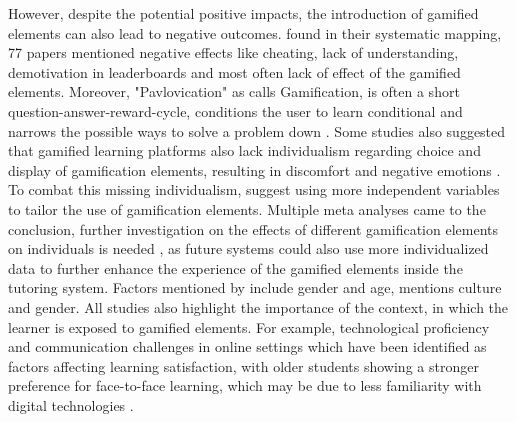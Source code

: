 However, despite the potential positive impacts, the introduction of gamified elements can also lead to negative outcomes.
\textcite{almeidaSystematicMappingNegative2021} found in their systematic mapping, 77 papers mentioned negative effects like cheating, lack of understanding, demotivation in leaderboards and most often lack of effect of the gamified elements.
Moreover, "Pavlovication" as \textcite{klabbersArchitectureGameScience2018} calls Gamification, is often a short question-answer-reward-cycle, conditions the user to learn conditional and narrows the possible ways to solve a problem down \parencite{klabbersArchitectureGameScience2018}.
Some studies also suggested that gamified learning platforms also lack individualism regarding choice and display of gamification elements, resulting in discomfort and negative emotions \parencite{santosDoesGenderStereotype2023}.
To combat this missing individualism, \textcite{oliveiraTailoredGamificationEducation2023,dehghanzadehUsingGamificationSupport2024} suggest using more independent variables to tailor the use of gamification elements.
Multiple meta analyses came to the conclusion, further investigation on the effects of different gamification elements on individuals is needed \textcite{oliveiraTailoredGamificationEducation2023,dehghanzadehUsingGamificationSupport2024,hamariDoesGamificationWork2014}, as future systems could also use more individualized data to further enhance the experience of the gamified elements inside the tutoring system.
Factors mentioned by \textcite{dehghanzadehUsingGamificationSupport2024} include gender and age, \textcite{oliveiraTailoredGamificationEducation2023} mentions culture and gender. All studies also highlight the importance of the context, in which the learner is exposed to gamified elements.
For example, technological proficiency and communication challenges in online settings which have been identified as factors affecting learning satisfaction, with older students showing a stronger preference for face-to-face learning, which may be due to less familiarity with digital technologies \parencite{dabajRoleGenderAge2009}.


